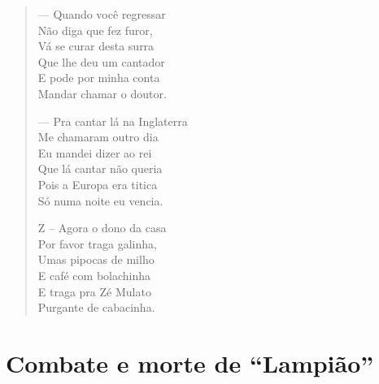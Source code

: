 \begin{verse}
— Quando você regressar\\
Não diga que fez furor,\\
Vá se curar desta surra\\
Que lhe deu um cantador\\
E pode por minha conta\\
Mandar chamar o doutor.

— Pra cantar lá na Inglaterra\\
Me chamaram outro dia\\
Eu mandei dizer ao rei\\
Que lá cantar não queria\\
Pois a Europa era titica\\
Só numa noite eu vencia.

Z – Agora o dono da casa\\
Por favor traga galinha,\\
Umas pipocas de milho\\
E café com bolachinha\\
E traga pra Zé Mulato\\
Purgante de cabacinha.
\end{verse}

\chapter{Combate e morte de “Lampião”}

